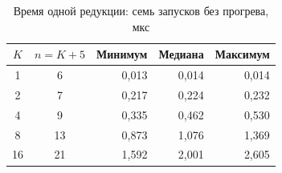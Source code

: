 \begin{table}[H]
\caption{Время одной редукции: семь запусков без прогрева, мкс}
\label{tab:reduce-benchmark}
\centering
\begin{tabular}{cc|rrr}
$K$ & $n=K+5$ & Минимум & Медиана & Максимум \\
\hline
1 & 6 & 0,013 & 0,014 & 0,014 \\
2 & 7 & 0,217 & 0,224 & 0,232 \\
4 & 9 & 0,335 & 0,462 & 0,530 \\
8 & 13 & 0,873 & 1,076 & 1,369 \\
16 & 21 & 1,592 & 2,001 & 2,605 \\
\end{tabular}
\end{table}
